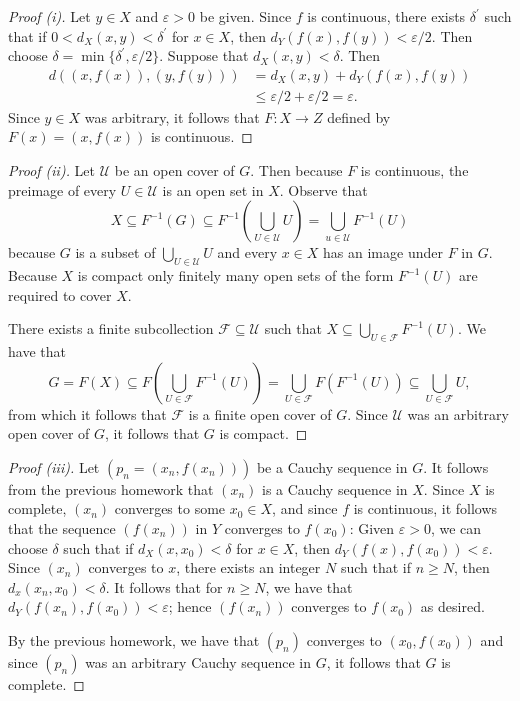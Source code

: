 \documentclass[12pt]{amsart}
\begin{document}
\begin{proof}[Proof (i)]
    Let $y\in X$ and $\varepsilon>0$ be given. Since $f$ is continuous, there exists $\delta^{\prime}$ such that if $0< d_X(x,y)< \delta^{\prime}$ for $x\in X$, then $d_Y(f(x),f(y))< \varepsilon/2$. Then choose $\delta = \min\{\delta^{\prime}, \varepsilon/2\}$. Suppose that $d_X(x,y)<\delta$. Then \begin{align*}
        d((x,f(x)),(y,f(y))) &= d_X(x,y) + d_Y(f(x),f(y)) \\
        &\leq \varepsilon/2 + \varepsilon/2 = \varepsilon.
    \end{align*}
    Since $y\in X$ was arbitrary, it follows that $F:X\to Z$ defined by $F(x)=(x,f(x))$ is continuous.
\end{proof}
\begin{proof}[Proof (ii)]
    Let $\mathcal{U}$ be an open cover of $G$. Then because $F$ is continuous, the preimage of every $U\in \mathcal{U}$ is an open set in $X$. Observe that \[X\subseteq F^{-1}(G)\subseteq F^{-1}\left(\bigcup_{U\in\mathcal{U}}U\right) = \bigcup_{u\in\mathcal{U}}F^{-1}(U)\] because $G$ is a subset of $\bigcup_{U\in\mathcal{U}}U$ and every $x\in X$ has an image under $F$ in $G$. Because $X$ is compact only finitely many open sets of the form $F^{-1}(U)$ are required to cover $X$. 

    There exists a finite subcollection $\mathcal{F}\subseteq \mathcal{U}$ such that $X\subseteq \bigcup_{U\in\mathcal{F}}F^{-1}(U)$.
    We have that \[G = F(X)\subseteq F\left(\bigcup_{U\in\mathcal{F}}F^{-1}(U)\right) = \bigcup_{U\in\mathcal{F}}F(F^{-1}(U))\subseteq \bigcup_{U\in\mathcal{F}}U,\] from which it follows that $\mathcal{F}$ is a finite open cover of $G$. Since $\mathcal{U}$ was an arbitrary open cover of $G$, it follows that $G$ is compact.
\end{proof}
\begin{proof}[Proof (iii)]
    Let $(p_n = (x_n,f(x_n)))$ be a Cauchy sequence in $G$. It follows from the previous homework that $(x_n)$ is a Cauchy sequence in $X$. Since $X$ is complete, $(x_n)$ converges to some $x_0\in X$, and since $f$ is continuous, it follows that the sequence $(f(x_n))$ in $Y$ converges to $f(x_0)$: Given $\varepsilon>0$, we can choose $\delta$ such that if $d_X(x,x_0)<\delta$ for $x\in X$, then $d_Y(f(x),f(x_0)) < \varepsilon$. Since $(x_n)$ converges to $x$, there exists an integer $N$ such that if $n\geq N$, then $d_x(x_n,x_0) < \delta$. It follows that for $n\geq N$, we have that $d_Y(f(x_n),f(x_0)) < \varepsilon$; hence $(f(x_n))$ converges to $f(x_0)$ as desired.
    
    By the previous homework, we have that $(p_n)$ converges to $(x_0,f(x_0))$ and since $(p_n)$ was an arbitrary Cauchy sequence in $G$, it follows that $G$ is complete. 
\end{proof}
\end{document}
